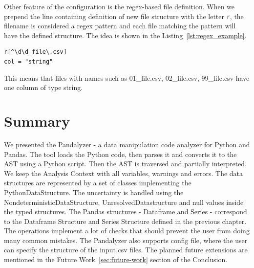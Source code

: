Other feature of the configuration is the regex-based file definition.
When we prepend the line containing definition of new file structure with the letter \verb|r|, the filename is
considered a regex pattern and each file matching the pattern will have the defined structure.
The idea is shown in the Listing~\ref{lst:regex_example}.

\begin{lstlisting}[caption=An example regex-based file definition, label={lst:regex_example}, captionpos=b]
r[^\d\d_file\.csv]
col = "string"
\end{lstlisting}

This means that files with names such as 01\_file.csv, 02\_file.csv, 99\_file.csv have one column of type string.

\section*{Summary}

We presented the Pandalyzer - a data manipulation code analyzer for Python and Pandas.
The tool loads the Python code, then parses it and converts it to the AST using a Python script.
Then the AST is traversed and partially interpreted.
We keep the Analysis Context with all variables, warnings and errors.
The data structures are represented by a set of classes implementing the PythonDataStructure.
The uncertainty is handled using the NondeterministicDataStructure, UnresolvedDatastructure and null values inside the
typed structures.
The Pandas structures - Dataframe and Series - correspond to the Dataframe Structure and Series Structure defined
in the previous chapter.
The operations implement a lot of checks that should prevent the user from doing many common mistakes.
The Pandalyzer also supports config file, where the user can specify the structure of the input csv files.
The planned future extensions are mentioned in the Future Work~\ref{sec:future-work} section of the Conclusion.